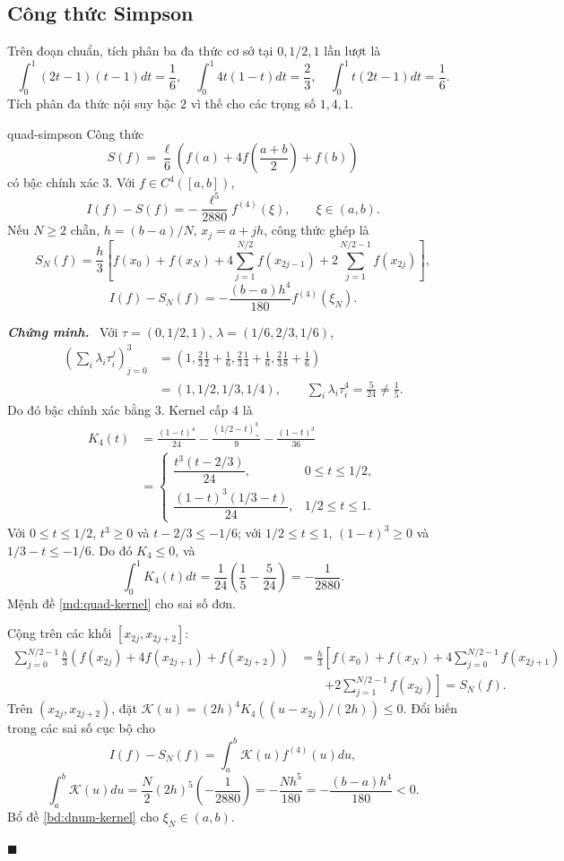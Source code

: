 \documentclass[12pt,a4paper,oneside]{book}
\numberwithin{algorithm}{chapter}
\theoremstyle{definition}
\newenvironment{chungminh}{\par\medskip\noindent\textbf{\textit{\color{mainblue}Chứng minh.}}\ }{\hfill$\blacksquare$\par\medskip}
\begin{document}
\subsection{Công thức Simpson}
Trên đoạn chuẩn, tích phân ba đa thức cơ sở tại $0,1/2,1$ lần lượt là
\[
 \int_0^1(2t-1)(t-1)dt=\frac16,\quad
 \int_0^1 4t(1-t)dt=\frac23,\quad
 \int_0^1t(2t-1)dt=\frac16.
\]
Tích phân đa thức nội suy bậc $2$ vì thế cho các trọng số $1,4,1$.
\begin{dinhly}{}{quad-simpson}
Công thức
\[
 S(f)=\frac\ell6\left(f(a)+4f\left(\frac{a+b}{2}\right)+f(b)\right)
\]
có bậc chính xác $3$. Với $f\in C^4([a,b])$,
\[
 I(f)-S(f)=-\frac{\ell^5}{2880}f^{(4)}(\xi),\qquad\xi\in(a,b).
\]
Nếu $N\geq2$ chẵn, $h=(b-a)/N$, $x_j=a+jh$, công thức ghép là
\begin{equation}\label{eq:quad-simpson-composite}
 S_N(f)=\frac h3\left[f(x_0)+f(x_N)+4\sum_{j=1}^{N/2}f(x_{2j-1})
 +2\sum_{j=1}^{N/2-1}f(x_{2j})\right],
\end{equation}
\[
 I(f)-S_N(f)=-\frac{(b-a)h^4}{180}f^{(4)}(\xi_N).
\]
\end{dinhly}
\begin{chungminh}
Với $\tau=(0,1/2,1)$, $\lambda=(1/6,2/3,1/6)$,
\begin{align*}
 \left(\sum_i\lambda_i\tau_i^j\right)_{j=0}^3
 &=\left(1,\frac23\frac12+\frac16,\frac23\frac14+\frac16,\frac23\frac18+\frac16\right)\\
 &=(1,1/2,1/3,1/4),\qquad \sum_i\lambda_i\tau_i^4=\frac5{24}\ne\frac15.
\end{align*}
Do đó bậc chính xác bằng $3$. Kernel cấp $4$ là
\begin{align*}
 K_4(t)&=\frac{(1-t)^4}{24}-\frac{(1/2-t)_+^3}{9}-\frac{(1-t)^3}{36}\\
 &=\begin{cases}
 \dfrac{t^3(t-2/3)}{24},&0\leq t\leq1/2,\\[1mm]
 \dfrac{(1-t)^3(1/3-t)}{24},&1/2\leq t\leq1.
 \end{cases}
\end{align*}
Với $0\leq t\leq1/2$, $t^3\geq0$ và $t-2/3\leq-1/6$; với $1/2\leq t\leq1$, $(1-t)^3\geq0$ và $1/3-t\leq-1/6$. Do đó $K_4\leq0$, và
\[
 \int_0^1K_4(t)dt=\frac1{24}\left(\frac15-\frac5{24}\right)=-\frac1{2880}.
\]
Mệnh đề \ref{md:quad-kernel} cho sai số đơn.


Cộng trên các khối $[x_{2j},x_{2j+2}]$:
\begin{align*}
 \sum_{j=0}^{N/2-1}\frac h3(f(x_{2j})+4f(x_{2j+1})+f(x_{2j+2}))
 &=\frac h3\left[f(x_0)+f(x_N)+4\sum_{j=0}^{N/2-1}f(x_{2j+1})\right.\\
 &\qquad\left. +2\sum_{j=1}^{N/2-1}f(x_{2j})\right]=S_N(f).
\end{align*}
Trên $(x_{2j},x_{2j+2})$, đặt $\mathcal K(u)=(2h)^4K_4((u-x_{2j})/(2h))\leq0$. Đổi biến trong các sai số cục bộ cho
\[
 I(f)-S_N(f)=\int_a^b\mathcal K(u)f^{(4)}(u)du,
\]
\[
 \int_a^b\mathcal K(u)du
 =\frac N2(2h)^5\left(-\frac1{2880}\right)
 =-\frac{Nh^5}{180}=-\frac{(b-a)h^4}{180}<0.
\]
Bổ đề \ref{bd:dnum-kernel} cho $\xi_N\in(a,b)$.

\end{chungminh}
\end{document}
